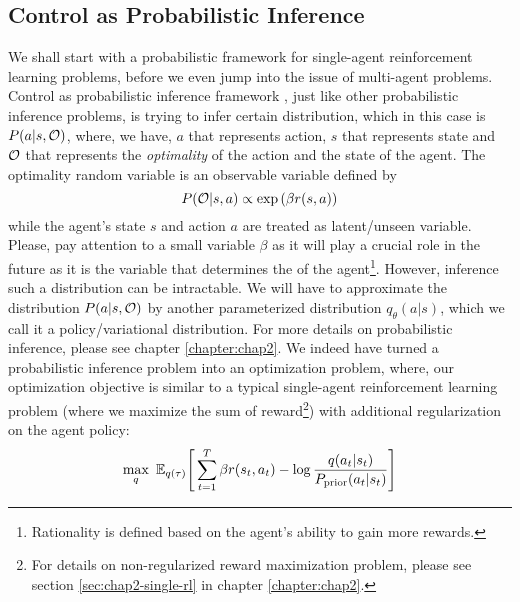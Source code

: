 \subsection{Control as Probabilistic Inference}
\label{sec:chap1-MERL-intro}
We shall start with a probabilistic framework for single-agent reinforcement learning problems,  before we even jump into the issue of multi-agent problems. Control as probabilistic inference framework \cite{levine2018reinforcement, ziebart2008maximum}, just like other probabilistic inference problems, is trying to infer certain distribution, which in this case is $P(a | s, \mathcal{O})$, where, we have, $a$ that represents action, $s$ that represents state and $\mathcal{O}$ that represents the \textit{optimality} of the action and the state of the agent. The optimality random variable is an observable variable defined by 
\begin{equation}
    P(\mathcal{O} | s, a) \propto \exp\left( \beta r(s, a) \right)
\end{equation}
while the agent's state $s$ and action $a$ are treated as latent/unseen variable. Please, pay attention to a small variable $\beta$ as it will play a crucial role in the future as it is the variable that determines the  of the agent\footnote{Rationality is defined based on the agent's ability to gain more rewards.}. However, inference such a distribution can be intractable. We will have to approximate the distribution $P(a | s, \mathcal{O})$ by another parameterized distribution $q_\theta(a | s)$, which we call it a policy/variational distribution. For more details on probabilistic inference, please see chapter \ref{chapter:chap2}. We indeed have turned a probabilistic inference problem into an optimization problem, where, our optimization objective is similar to a typical single-agent reinforcement learning problem (where we maximize the sum of reward\footnote{For details on non-regularized reward maximization problem, please see section \ref{sec:chap2-single-rl} in chapter \ref{chapter:chap2}.}) with additional regularization on the agent policy:
\begin{equation}
\label{eqn:chap1-optim-objective}
    \max_q \ \mathbb{E}_{q(\tau)}\Bigg[\sum^T_{t=1} \beta r(s_t, a_t) - \log\frac{q(a_t | s_t)}{P_{\text{prior}}(a_t | s_t)} \Bigg]
\end{equation}
